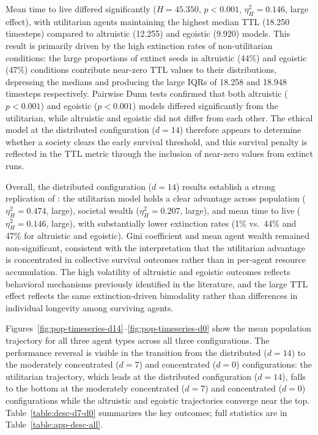 \documentclass{icsthesis}
\begin{document}
\begin{mainmatter}
Mean time to live differed significantly ($H = 45.350$, $p < 0.001$, $\eta^2_H = 0.146$, large effect), with utilitarian agents maintaining the highest median TTL (18.250 timesteps) compared to altruistic (12.255) and egoistic (9.920) models. This result is primarily driven by the high extinction rates of non-utilitarian conditions: the large proportions of extinct seeds in altruistic (44\%) and egoistic (47\%) conditions contribute near-zero TTL values to their distributions, depressing the medians and producing the large IQRs of 18.258 and 18.948 timesteps respectively. Pairwise Dunn tests confirmed that both altruistic ($p < 0.001$) and egoistic ($p < 0.001$) models differed significantly from the utilitarian, while altruistic and egoistic did not differ from each other. The ethical model at the distributed configuration ($d = 14$) therefore appears to determine whether a society clears the early survival threshold, and this survival penalty is reflected in the TTL metric through the inclusion of near-zero values from extinct runs.

Overall, the distributed configuration ($d = 14$) results establish a strong replication of \citet{KremerHerman2024}: the utilitarian model holds a clear advantage across population ($\eta^2_H = 0.474$, large), societal wealth ($\eta^2_H = 0.207$, large), and mean time to live ($\eta^2_H = 0.146$, large), with substantially lower extinction rates (1\% vs.\ 44\% and 47\% for altruistic and egoistic). Gini coefficient and mean agent wealth remained non-significant, consistent with the interpretation that the utilitarian advantage is concentrated in collective survival outcomes rather than in per-agent resource accumulation. The high volatility of altruistic and egoistic outcomes reflects behavioral mechanisms previously identified in the literature, and the large TTL effect reflects the same extinction-driven bimodality rather than differences in individual longevity among surviving agents.


Figures~\ref{fig:pop-timeseries-d14}--\ref{fig:pop-timeseries-d0} show the mean population trajectory for all three agent types across all three configurations. The performance reversal is visible in the transition from the distributed ($d = 14$) to the moderately concentrated ($d = 7$) and concentrated ($d = 0$) configurations: the utilitarian trajectory, which leads at the distributed configuration ($d = 14$), falls to the bottom at the moderately concentrated ($d = 7$) and concentrated ($d = 0$) configurations while the altruistic and egoistic trajectories converge near the top. Table~\ref{table:desc-d7-d0} summarizes the key outcomes; full statistics are in Table~\ref{table:app-desc-all}.


\end{mainmatter}
\end{document}

